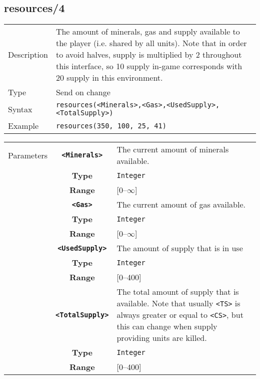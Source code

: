 \subsection{resources/4}
\begin{tabularx}{\textwidth}{lX}
 Description & The amount of minerals, gas and supply available to the player (i.e. shared by all units). Note that in order to avoid halves, supply is multiplied by 2 throughout this interface, so 10 supply in-game corresponds with 20 supply in this environment. \\
 Type & Send on change \\
 Syntax & \verb|resources(<Minerals>,<Gas>,<UsedSupply>,<TotalSupply>)| \\
 Example & \verb|resources(350, 100, 25, 41)| \\
 \end{tabularx}
 \begin{tabularx}{\textwidth}{l | c | p{8cm}|}
 \cline{2-3}
 Parameters & \textbf{\verb|<Minerals>|} & The current amount of minerals available. \\
            & \textbf{Type} & \verb|Integer| \\
            & \textbf{Range} & [0--$\infty$] \\
            \cline{2-3}
            & \textbf{\verb|<Gas>|} & The current amount of gas available. \\
            & \textbf{Type} & \verb|Integer| \\
            & \textbf{Range} & [0--$\infty$] \\
            \cline{2-3}
            & \textbf{\verb|<UsedSupply>|} & The amount of supply that is in use \\
            & \textbf{Type} & \verb|Integer| \\
            & \textbf{Range} & [0--400] \\
            \cline{2-3}
            & \textbf{\verb|<TotalSupply>|} & The total amount of supply that is available. Note that usually \verb|<TS>| is always greater or equal to \verb|<CS>|, but this can change when supply providing units are killed. \\
            & \textbf{Type} & \verb|Integer| \\
            & \textbf{Range} & [0--400] \\
            \cline{2-3}
\end{tabularx}

